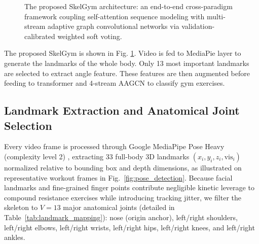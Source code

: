 \documentclass[preprint,12pt]{elsarticle}
\newcommand{\rv}[1]{{\color{red}#1}}
\begin{document}
\begin{figure}[!b]
{
}
\caption{The proposed SkelGym architecture: an end-to-end cross-paradigm framework coupling self-attention sequence modeling with multi-stream adaptive graph convolutional networks via validation-calibrated weighted soft voting.}
\label{fig:pipeline_full}
\end{figure}

\rv{The proposed SkelGym is shown in Fig. \ref{fig:pipeline_full}.
Video is fed to MediaPie layer to generate the landmarks of the whole body.
Only 13 most important  landmarks are selected to extract angle feature.
These features are then augmented before feeding to transformer and 4-stream AAGCN to classify gym exercises.
}

\subsection{Landmark Extraction and Anatomical Joint Selection}
Every video frame is processed through Google MediaPipe Pose Heavy (complexity level 2) \cite{chuankun2019,bazarevsky2020}, extracting 33 full-body 3D landmarks $(x_i, y_i, z_i, \text{vis}_i)$ normalized relative to bounding box and depth dimensions, as illustrated on representative workout frames in Fig.~\ref{fig:pose_detection}. 
Because facial landmarks and fine-grained finger points contribute negligible kinetic leverage to compound resistance exercises while introducing tracking jitter, we filter the skeleton to $V=13$ major anatomical joints (detailed in Table~\ref{tab:landmark_mapping}): nose (origin anchor), left/right shoulders, left/right elbows, left/right wrists, left/right hips, left/right knees, and left/right ankles.
\end{document}
